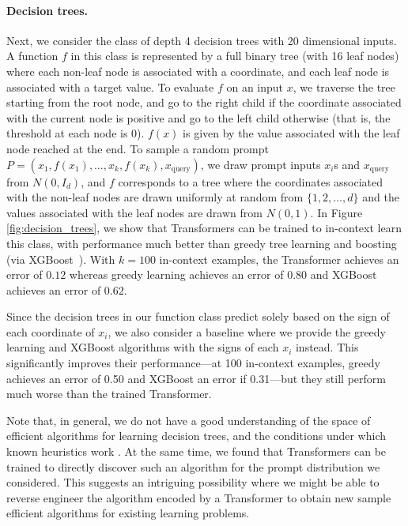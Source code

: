 \documentclass{article}
\begin{document}
\paragraph{Decision trees.} 
Next, we consider the class of depth 4 decision trees with 20 dimensional inputs. A function $f$ in this class is represented by a full binary tree (with 16 leaf nodes) where each non-leaf node is associated with a coordinate, and each leaf node is associated with a target value. To evaluate $f$ on an input $x$, we traverse the tree starting from the root node, and go to the right child if the coordinate associated with the current node is positive and go to the left child otherwise (that is, the threshold at each node is $0$). $f(x)$ is given by the value associated with the leaf node reached at the end. To sample a  random prompt $P = (x_1, f(x_1), \ldots, x_k, f(x_k), x_\text{query})$, we draw prompt inputs $x_i$s and $x_\text{query}$ from $N(0, I_d)$, and $f$ corresponds to a tree where the coordinates associated with the non-leaf nodes are drawn uniformly at random from $\{1, 2,  \ldots, d\}$ and the values associated with the leaf nodes are drawn from $N(0, 1)$. 
In Figure \ref{fig:decision_trees}, we show that Transformers can be trained to in-context learn this class, with performance much better than  greedy tree learning and boosting (via XGBoost~\citep{chen2016xgboost}).
With $k=100$ in-context examples, the Transformer achieves an error of $0.12$ whereas greedy learning achieves an error of $0.80$ and XGBoost achieves an error of $0.62$.

Since the decision trees in our function class predict solely based on the sign of each coordinate of $x_i$, we also consider a baseline where we provide the greedy learning and XGBoost algorithms with the signs of each $x_i$ instead. 
This significantly improves their performance---at 100 in-context examples, greedy achieves an error of 0.50 and XGBoost an error if 0.31---but they still perform much worse than the trained Transformer.

Note that, in general, we do not have a good understanding of the space of efficient algorithms for learning decision trees, and the conditions under which known heuristics work \citep{blanc2021decision, brutzkus2020id3}.
At the same time, we found that Transformers can be trained to directly discover such an algorithm for the prompt distribution we considered. This suggests an intriguing possibility where we might be able to reverse engineer the algorithm encoded by a Transformer to obtain new sample efficient algorithms for existing learning problems. 
\end{document}
